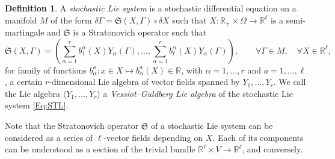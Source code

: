 \documentclass[11pt]{article}
\theoremstyle{plain}
\theoremstyle{definition}
\newtheorem{definition}[theorem]{Definition}
\begin{document}
\begin{definition} A {\it stochastic Lie system} is a stochastic differential equation on a manifold $M$ of the form $
\delta \Gamma=\mathfrak{S}(X,\Gamma)\circ \delta X
$ such that $X:\mathbb{R}_+\times \Omega\rightarrow \mathbb{R}^\ell$ is a semi-martingale and $\mathfrak{S}$ is a Stratonovich operator such that 
\begin{equation}
\label{Eq:STL}\mathfrak{S}(X,\Gamma)=\left(\sum_{\alpha=1}^rb_1^\alpha(X)Y_\alpha(\Gamma),\ldots,\sum_{\alpha=1}^rb_\ell^\alpha(X)Y_\alpha(\Gamma)\right),\qquad \forall\Gamma\in M,\quad \forall X\in \mathbb{R}^\ell,
\end{equation}
for family of functions $b^a_\alpha:x\in X\mapsto b^a_\alpha(X)\in \mathbb{R}$, with $\alpha=1,\ldots,r$ and $a=1,\ldots,\ell$, a certain $r$-dimensional Lie algebra of vector fields spanned by $Y_1,\ldots,Y_r$.    We call the Lie algebra $\langle Y_1,\ldots,Y_r\rangle$ a {\it Vessiot--Guldberg Lie algebra} of the stochastic Lie system \eqref{Eq:STL}.
\end{definition}

Note that the Stratonovich operator $\mathfrak{S}$ of a stochastic Lie system can be considered as a series of $\ell$-vector fields depending on $X$. Each of its components can be understood as a section of the trivial bundle $ \mathbb{R}^{\ell}\times V\rightarrow \mathbb{R}^\ell$, and conversely.
\end{document}
